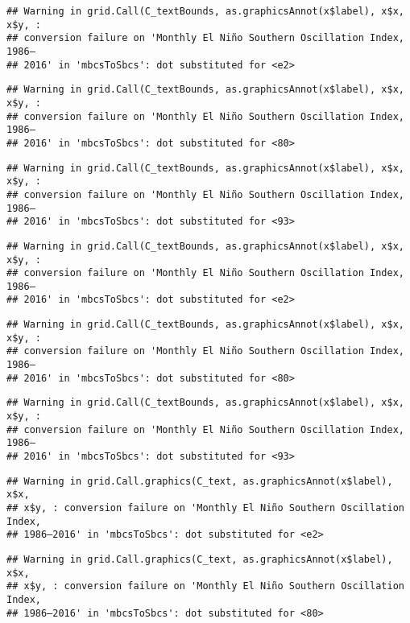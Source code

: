 \documentclass[]{article}
\theoremstyle{definition}
\theoremstyle{definition}
\theoremstyle{definition}
\theoremstyle{remark}
\begin{document}
\begin{verbatim}
## Warning in grid.Call(C_textBounds, as.graphicsAnnot(x$label), x$x, x$y, :
## conversion failure on 'Monthly El Niño Southern Oscillation Index, 1986–
## 2016' in 'mbcsToSbcs': dot substituted for <e2>
\end{verbatim}

\begin{verbatim}
## Warning in grid.Call(C_textBounds, as.graphicsAnnot(x$label), x$x, x$y, :
## conversion failure on 'Monthly El Niño Southern Oscillation Index, 1986–
## 2016' in 'mbcsToSbcs': dot substituted for <80>
\end{verbatim}

\begin{verbatim}
## Warning in grid.Call(C_textBounds, as.graphicsAnnot(x$label), x$x, x$y, :
## conversion failure on 'Monthly El Niño Southern Oscillation Index, 1986–
## 2016' in 'mbcsToSbcs': dot substituted for <93>
\end{verbatim}

\begin{verbatim}
## Warning in grid.Call(C_textBounds, as.graphicsAnnot(x$label), x$x, x$y, :
## conversion failure on 'Monthly El Niño Southern Oscillation Index, 1986–
## 2016' in 'mbcsToSbcs': dot substituted for <e2>
\end{verbatim}

\begin{verbatim}
## Warning in grid.Call(C_textBounds, as.graphicsAnnot(x$label), x$x, x$y, :
## conversion failure on 'Monthly El Niño Southern Oscillation Index, 1986–
## 2016' in 'mbcsToSbcs': dot substituted for <80>
\end{verbatim}

\begin{verbatim}
## Warning in grid.Call(C_textBounds, as.graphicsAnnot(x$label), x$x, x$y, :
## conversion failure on 'Monthly El Niño Southern Oscillation Index, 1986–
## 2016' in 'mbcsToSbcs': dot substituted for <93>
\end{verbatim}

\begin{verbatim}
## Warning in grid.Call.graphics(C_text, as.graphicsAnnot(x$label), x$x,
## x$y, : conversion failure on 'Monthly El Niño Southern Oscillation Index,
## 1986–2016' in 'mbcsToSbcs': dot substituted for <e2>
\end{verbatim}

\begin{verbatim}
## Warning in grid.Call.graphics(C_text, as.graphicsAnnot(x$label), x$x,
## x$y, : conversion failure on 'Monthly El Niño Southern Oscillation Index,
## 1986–2016' in 'mbcsToSbcs': dot substituted for <80>
\end{verbatim}
\end{document}

